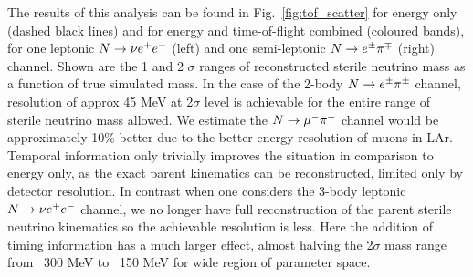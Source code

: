 \documentclass[11pt, a4paper]{article}
\newcommand{\reffig}[1]{Fig.~\ref{#1}}
\def\ster{\ensuremath N}
\begin{document}
The results of this analysis can be found in \reffig{fig:tof_scatter} for energy only (dashed black lines) and for energy and time-of-flight combined (coloured bands), for one leptonic $\ster \rightarrow \nu e^+ e^-$ (left)  and one semi-leptonic $\ster \rightarrow e^\pm \pi^\mp$ (right) channel. Shown are the 1 and 2 $\sigma$ ranges of reconstructed sterile neutrino mass as a function of true simulated mass. In the case of the 2-body $\ster \rightarrow e^\pm \pi^\pm$ channel, resolution of approx 45 MeV at 2$\sigma$ level is achievable for the entire range of sterile neutrino mass allowed. We estimate the $\ster\rightarrow \mu^- \pi^+$ channel would be approximately 10\% better due to the better energy resolution of muons in LAr. Temporal information only trivially improves the situation in comparison to energy only, as the exact parent kinematics can be reconstructed, limited only by detector resolution. In contrast when one considers the 3-body leptonic $\ster \rightarrow \nu e^+ e^-$ channel, we no longer have full reconstruction of the parent sterile neutrino kinematics so the achievable resolution is less. Here the addition of timing information has a much larger effect, almost halving the 2$\sigma$ mass range from ~300 MeV to ~150 MeV for wide region of parameter space.
\end{document}
